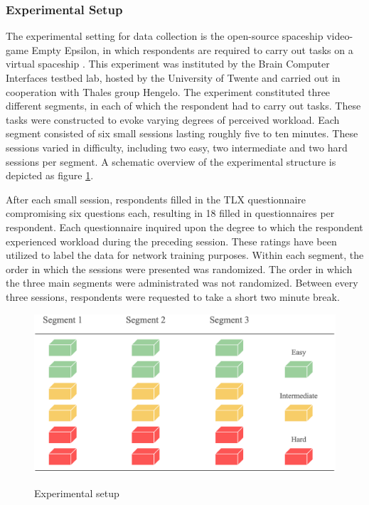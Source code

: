 \documentclass[12pt]{article}
\begin{document}
\subsubsection{Experimental Setup}
The experimental setting for data collection is the open-source spaceship video-game Empty Epsilon, in which respondents are required to carry out tasks on a virtual spaceship \cite{daid2016empty}. This experiment was instituted by the Brain Computer Interfaces testbed lab, hosted by the University of Twente and carried out in cooperation with Thales group Hengelo. The experiment constituted three different segments, in each of which the respondent had to carry out tasks. These tasks were constructed to evoke varying degrees of perceived workload. Each segment consisted of six small sessions lasting roughly five to ten minutes. These sessions varied in difficulty, including two easy, two intermediate and two hard sessions per segment. A schematic overview of the experimental structure is depicted as figure \ref{fig:experimental}. 

After each small session, respondents filled in the TLX questionnaire compromising six questions each, resulting in 18 filled in questionnaires per respondent. Each questionnaire inquired upon the degree to which the respondent experienced workload during the preceding session. These ratings have been utilized to label the data for network training purposes. Within each segment, the order in which the sessions were presented was randomized. The order in which the three main segments were administrated was not randomized. Between every three sessions, respondents were requested to take a short two minute break.

\begin{figure}
\caption{Experimental setup}
\bigskip
\includegraphics[scale=0.4]{experimental_setup}
\label{fig:experimental}
\end{figure}
\end{document}
